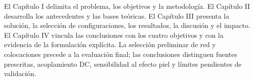 El Capítulo I delimita el problema, los objetivos y la metodología. El Capítulo II desarrolla los antecedentes y las bases teóricas. El Capítulo III presenta la solución, la selección de configuraciones, los resultados, la discusión y el impacto. El Capítulo IV vincula las conclusiones con los cuatro objetivos y con la evidencia de la formulación explícita. La selección preliminar de red y colocaciones precede a la evaluación final; las conclusiones distinguen fuentes prescritas, acoplamiento DC, sensibilidad al efecto piel y límites pendientes de validación.

